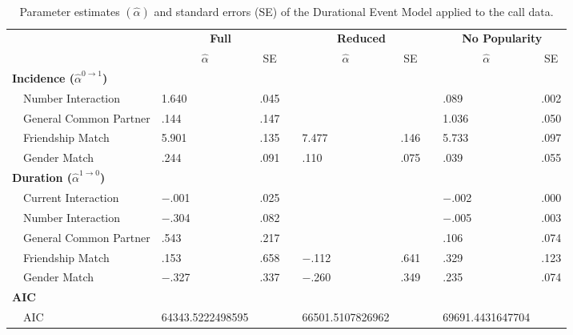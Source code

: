 \begin{table}[t!]
\caption{Parameter estimates $(\hat{\alpha})$ and standard errors (SE) of the Durational Event Model applied to the call data.\label{tbl:results_gof}} 
\begin{center}
\begin{tabular}{lllcllcll}
\hline
\multicolumn{1}{l}{\bfseries }&\multicolumn{2}{c}{\bfseries Full}&\multicolumn{1}{l}{\bfseries }&\multicolumn{2}{c}{\bfseries Reduced}&\multicolumn{1}{l}{\bfseries }&\multicolumn{2}{c}{\bfseries No Popularity}\tabularnewline
\cline{2-3} \cline{5-6} \cline{8-9}
\multicolumn{1}{l}{}&\multicolumn{1}{c}{$\hat{\alpha}$}&\multicolumn{1}{c}{SE}&\multicolumn{1}{c}{}&\multicolumn{1}{c}{$\hat{\alpha}$}&\multicolumn{1}{c}{SE}&\multicolumn{1}{c}{}&\multicolumn{1}{c}{$\hat{\alpha}$}&\multicolumn{1}{c}{SE}\tabularnewline
\hline
{\bfseries Incidence ($\hat \alpha^{0\rightarrow 1}$)}&&&&&&&&\tabularnewline
~~Number Interaction&1.640&.045&&&&&.089&.002\tabularnewline
~~General Common Partner&.144&.147&&&&&1.036&.050\tabularnewline
~~Friendship Match&5.901&.135&&7.477&.146&&5.733&.097\tabularnewline
~~Gender Match&.244&.091&&.110&.075&&.039&.055\tabularnewline
\hline
{\bfseries Duration ($\hat \alpha^{1\rightarrow 0}$)}&&&&&&&&\tabularnewline
~~Current Interaction&$-$.001&.025&&&&&$-$.002&.000\tabularnewline
~~Number Interaction&$-$.304&.082&&&&&$-$.005&.003\tabularnewline
~~General Common Partner&.543&.217&&&&&.106&.074\tabularnewline
~~Friendship Match&.153&.658&&$-$.112&.641&&.329&.123\tabularnewline
~~Gender Match&$-$.327&.337&&$-$.260&.349&&.235&.074\tabularnewline
\hline
{\bfseries AIC}&&&&&&&&\tabularnewline
~~AIC&64343.5222498595&&&66501.5107826962&&&69691.4431647704&\tabularnewline
\hline
\end{tabular}\end{center}
\end{table}
